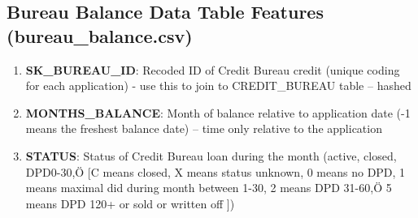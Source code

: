 \documentclass[12pt, letterpaper]{article}
\begin{document}
\begin{appendices}
\subsection{Bureau Balance Data Table Features (bureau_balance.csv)}
\begin{enumerate}
  \item \textbf{SK_BUREAU_ID}: Recoded ID of Credit Bureau credit (unique coding for each application) - use this to join to CREDIT_BUREAU table -- hashed
  \item \textbf{MONTHS_BALANCE}: Month of balance relative to application date (-1 means the freshest balance date) -- time only relative to the application
  \item \textbf{STATUS}: Status of Credit Bureau loan during the month (active, closed, DPD0-30,Ö [C means closed, X means status unknown, 0 means no DPD, 1 means maximal did during month between 1-30, 2 means DPD 31-60,Ö 5 means DPD 120+ or sold or written off ])
\end{enumerate}


\end{appendices}
\end{document}
